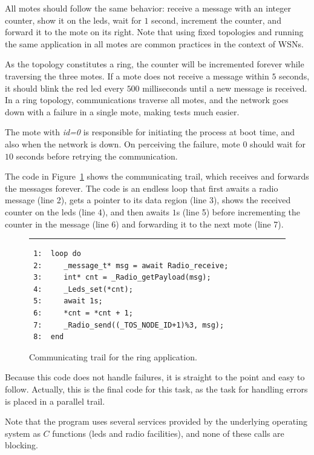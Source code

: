 \documentclass{sigplan-proc}
\newcommand{\2}{\;\;}
\newcommand{\5}{\;\;\;\;\;}
\begin{document}
All motes should follow the same behavior: receive a message with an integer 
counter, show it on the leds, wait for $1$ second, increment the counter, and 
forward it to the mote on its right.
Note that using fixed topologies and running the same application in all motes 
are common practices in the context of WSNs.

As the topology constitutes a ring, the counter will be incremented forever 
while traversing the three motes.
If a mote does not receive a message within $5$ seconds, it should blink the 
red led every $500$ milliseconds until a new message is received.
In a ring topology, communications traverse all motes, and the network goes 
down with a failure in a single mote, making tests much easier.

The mote with \emph{id=0} is responsible for initiating the process at boot 
time, and also when the network is down.
On perceiving the failure, mote $0$ should wait for $10$ seconds before 
retrying the communication.

The code in Figure~\ref{lst:demos:ring:1} shows the communicating trail, which 
receives and forwards the messages forever.
The code is an endless loop that first awaits a radio message (line 2), gets a 
pointer to its data region (line 3), shows the received counter on the leds 
(line 4), and then awaits $1$s (line 5) before incrementing the counter in the 
message (line 6) and forwarding it to the next mote (line 7).

\begin{figure}[t]
\rule{8.5cm}{0.37pt}
{\small
\begin{verbatim}
 1:  loop do
 2:     _message_t* msg = await Radio_receive;
 3:     int* cnt = _Radio_getPayload(msg);
 4:     _Leds_set(*cnt);
 5:     await 1s;
 6:     *cnt = *cnt + 1;
 7:     _Radio_send((_TOS_NODE_ID+1)%3, msg);
 8:  end
\end{verbatim}
}
\caption{ Communicating trail for the ring application.
\label{lst:demos:ring:1}
}
\end{figure}

Because this code does not handle failures, it is straight to the point and 
easy to follow.
Actually, this is the final code for this task, as the task for handling errors 
is placed in a parallel trail.

Note that the program uses several services provided by the underlying 
operating system as $C$ functions (leds and radio facilities), and none of 
these calls are blocking.
\end{document}
